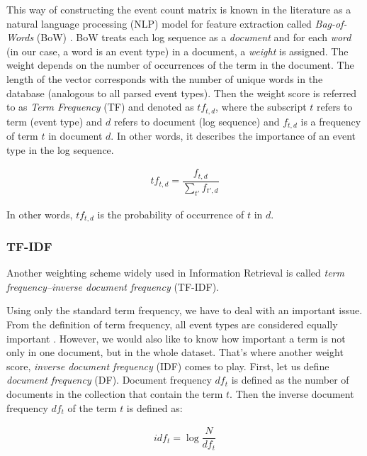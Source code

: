 This way of constructing the event count matrix is known in the literature as a natural language processing (NLP) model for feature extraction called \textit{Bag-of-Words} (BoW) \cite{informationRetrieval2008}. BoW treats each log sequence as a \textit{document} and for each \textit{word} (in our case, a word is an event type) in a document, a \textit{weight} is assigned. The weight depends on the number of occurrences of the term in the document. The length of the vector corresponds with the number of unique words in the database (analogous to all parsed event types). Then the weight score is referred to as \textit{Term Frequency} (TF) and denoted as $tf_{t,d}$, where the subscript $t$ refers to term (event type) and $d$ refers to document (log sequence) and $f_{t,d}$ is a frequency of term $t$ in document $d$. In other words, it describes the importance of an event type in the log sequence.

\begin{gather}
    tf_{t,d} = \dfrac{f_{t,d}}{\sum_{t'}f_{t', d}}
\end{gather}

In other words, $tf_{t, d}$ is the probability of occurrence of $t$ in $d$.


\subsubsection*{TF-IDF}
Another weighting scheme widely used in Information Retrieval is called \textit{term frequency–inverse document frequency} (TF-IDF). 

Using only the standard term frequency, we have to deal with an important issue. From the definition of term frequency, all event types are considered equally important \cite{informationRetrieval2008}. However, we would also like to know how important a term is not only in one document, but in the whole dataset. That's where another weight score, \textit{inverse document frequency} (IDF) comes to play. First, let us define \textit{document frequency} (DF). Document frequency $df_t$ is defined as the number of documents in the collection that contain the term $t$. Then the inverse document frequency $df_t$ of the term $t$ is defined as: 

\begin{gather}
    idf_t = \log{\dfrac{N}{df_t}}
    \label{formula:idf}
\end{gather}

